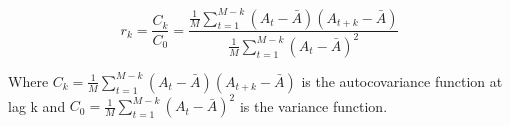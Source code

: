 \begin{enumerate}
    \begin{equation} \label{eq: autocorrelation}
      r_k = \frac{C_k}{C_0} = \frac{\frac{1}{M} \sum_{t = 1}^{M - k}{(A_t - \bar{A})(A_{t+k} - \bar{A})}}{\frac{1}{M} \sum_{t = 1}^{M - k}{(A_t - \bar{A})^2}}
    \end{equation}

    Where $C_k = \frac{1}{M} \sum_{t = 1}^{M - k}{(A_t - \bar{A})(A_{t+k} - \bar{A})}$ is the autocovariance function at lag k and $C_0 = \frac{1}{M} \sum_{t = 1}^{M - k}{(A_t - \bar{A})^2}$ is the variance function.
    

\end{enumerate}